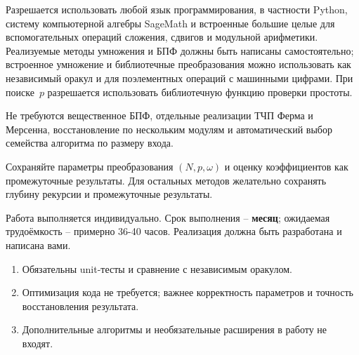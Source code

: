 \documentclass{ca-capstone}
\begin{document}
\details
Разрешается использовать любой язык программирования, в частности Python, систему 
компьютерной алгебры SageMath и встроенные большие целые для
вспомогательных операций сложения, сдвигов и модульной арифметики. Реализуемые методы
умножения и БПФ должны быть написаны самостоятельно; встроенное умножение и библиотечные
преобразования можно использовать как независимый оракул и для поэлементных операций с
машинными цифрами. При поиске~$p$ разрешается использовать библиотечную функцию проверки простоты.

Не требуются вещественное БПФ, отдельные реализации ТЧП Ферма и Мерсенна, восстановление
по нескольким модулям и автоматический выбор семейства алгоритма по размеру входа.

Сохраняйте параметры преобразования $(N,p,\omega)$ и оценку коэффициентов как промежуточные
результаты. Для остальных методов желательно сохранять глубину рекурсии и промежуточные результаты.

\schedule
Работа выполняется индивидуально. Срок выполнения -- \textbf{месяц}; ожидаемая трудоёмкость
-- примерно 36-40 часов. Реализация должна быть разработана и написана вами.

\remarks
\begin{enumerate}
  \item Обязательны unit-тесты и сравнение с независимым оракулом.
  \item Оптимизация кода не требуется; важнее корректность параметров и точность
    восстановления результата.
  \item Дополнительные алгоритмы и необязательные расширения в работу не входят.
\end{enumerate}

\end{document}

